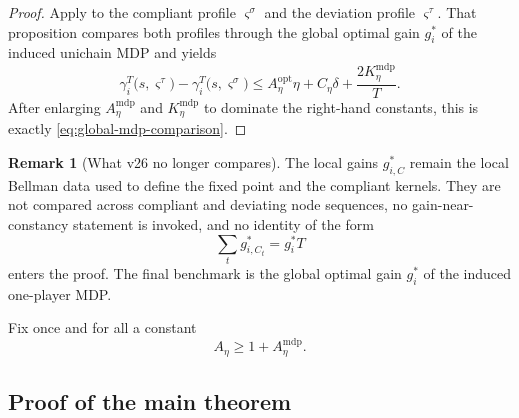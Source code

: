 \documentclass[12pt]{article}
\theoremstyle{definition}
\newtheorem{remark}[theorem]{Remark}
\newcommand{\1}{\mathbf{1}}
\begin{document}
\begin{proof}
Apply  to the compliant profile
$\varsigma^\sigma$ and the deviation profile $\varsigma^\tau$. That proposition
compares both profiles through the global optimal gain $g_i^*$ of the induced
unichain MDP and yields
\[
\gamma_i^T\bigl(s,\varsigma^\tau\bigr)
-
\gamma_i^T\bigl(s,\varsigma^\sigma\bigr)
\le
A_\eta^{\mathrm{opt}}\eta + C_\eta\delta + \frac{2K_\eta^{\mathrm{mdp}}}{T}.
\]
After enlarging $A_\eta^{\mathrm{mdp}}$ and $K_\eta^{\mathrm{mdp}}$ to dominate the
right-hand constants, this is exactly \eqref{eq:global-mdp-comparison}.
\end{proof}

\begin{remark}[What v26 no longer compares]
The local gains $g_{i,C}^*$ remain the local Bellman data used to define the
fixed point and the compliant kernels. They are not compared across compliant
and deviating node sequences, no gain-near-constancy statement is invoked, and
no identity of the form
\[
\sum_t g_{i,C_t}^*=g_i^* T
\]
enters the proof. The final benchmark is the global optimal gain $g_i^*$ of the
induced one-player MDP.
\end{remark}

Fix once and for all a constant
\[
A_\eta\ge 1+A_\eta^{\mathrm{mdp}}.
\]


\subsection{Proof of the main theorem}
\end{document}
